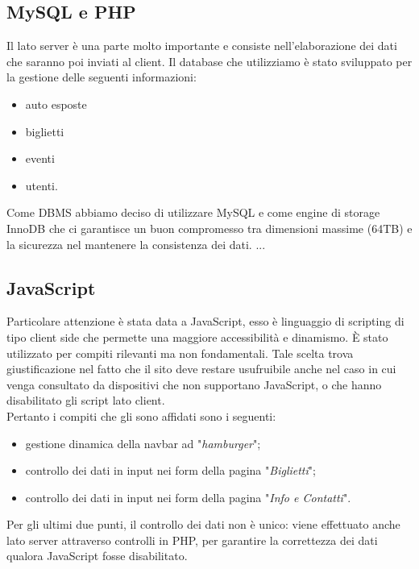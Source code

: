 \subsection{MySQL e PHP}
	Il lato server è una parte molto importante e consiste nell'elaborazione dei dati che saranno poi inviati al
	client. Il database che utilizziamo è stato sviluppato per la gestione delle seguenti informazioni:
	\begin{itemize}
		\item auto esposte 
		\item biglietti
		\item eventi
		\item utenti.
	\end{itemize}
	Come DBMS abbiamo deciso di utilizzare MySQL e come engine di storage InnoDB che
	ci garantisce un buon compromesso
	tra dimensioni massime (64TB) e la sicurezza nel mantenere la consistenza dei dati. 
	...
\subsection{JavaScript}
	Particolare attenzione è stata data a JavaScript, esso è linguaggio di scripting di tipo client side che permette una
	maggiore accessibilità e dinamismo. \`E stato utilizzato per compiti rilevanti ma non fondamentali. Tale scelta trova giustificazione nel fatto che il sito deve restare usufruibile anche nel caso in cui venga consultato da dispositivi che non supportano JavaScript, o che hanno disabilitato gli script lato client.\\
	Pertanto i compiti che gli sono affidati sono i seguenti:
	\begin{itemize}
		\item gestione dinamica della navbar ad "\textit{hamburger}";
		\item controllo dei dati in input nei form della pagina "\textit{Biglietti}";
		\item controllo dei dati in input nei form della pagina "\textit{Info e Contatti}".
	\end{itemize}
	Per gli ultimi due punti, il controllo dei dati non è unico: viene effettuato anche lato server attraverso controlli in PHP, per garantire la correttezza dei dati qualora JavaScript fosse disabilitato.
